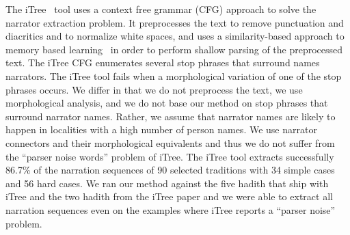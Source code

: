 \documentclass{llncs}
\begin{document}
The  iTree~\cite{Azmi-2010,iTree} tool
uses a context free grammar (CFG) approach to solve 
the narrator extraction problem. 
It preprocesses the text to remove punctuation and diacritics 
and to normalize white spaces, and uses a similarity-based approach
to memory based learning~\cite{Azmi-2010} 
in order to perform shallow parsing of the preprocessed text. 
The iTree CFG enumerates several stop phrases that surround
names narrators.
The iTree tool fails when a morphological variation of 
one of the stop phrases occurs.
We differ in that we do not preprocess the text,
we use morphological analysis,
and we do not base our method
on stop phrases that surround narrator names. 
Rather, we assume that narrator names are likely to happen in 
localities with a high number of person names. 
We use narrator connectors and their
morphological equivalents and thus we do not suffer from 
the ``parser noise words'' problem of iTree. 
The iTree tool extracts successfully 86.7\% of
the narration sequences of 90 selected traditions with 
34 simple cases and 56 hard cases. 
We ran our method against the five hadith that ship with
iTree and the two hadith from the iTree
paper and we were able to extract all narration
sequences even on the examples where iTree
reports a ``parser noise'' problem.

\end{document}
